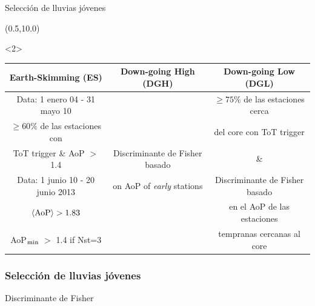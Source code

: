 \begin{frame}{Selecci\'on de lluvias j\'ovenes}
\begin{center}
% 				
		\begin{textblock}{15}(0.5,10.0)
			\begin{exampleblock}{}<2>
				\begin{center}
					{\scriptsize
					\renewcommand{\arraystretch}{1.3}
						\begin{tabular}{|c|c|c|}
						\hline
						Earth-Skimming (ES)          & Down-going High (DGH)    & Down-going Low (DGL)                       \\
						\hline\hline
						Data: 1 enero 04 - 31 mayo 10 &                                      & $\geq 75\%$ de las estaciones cerca \\
						$\geq 60\%$ de las estaciones con  &                                      & del core con ToT trigger  \\
						ToT trigger \& AoP $>$ 1.4    & Discriminante de Fisher basado             &      \&                      \\
						\cline{1-1}
						Data: 1 junio 10 - 20 junio 2013   & on AoP of {\it early} stations  & Discriminante de Fisher basado  \\
						$\langle {\rm AoP} \rangle> 1.83$  &                                 &  en el AoP de las estaciones \\
						AoP$_{\rm min}$ $>$ 1.4 if Nst=3   &                                 & tempranas cercanas al core         \\
						\hline
						\end{tabular}
					}
				\end{center}
			\end{exampleblock}
		\end{textblock}
	\end{center}
\end{frame}

\begin{frame}
 \frametitle{Selecci\'on de lluvias j\'ovenes}
 \begin{block}{Discriminante de Fisher}
 \centering
 \end{block}
\end{frame}

